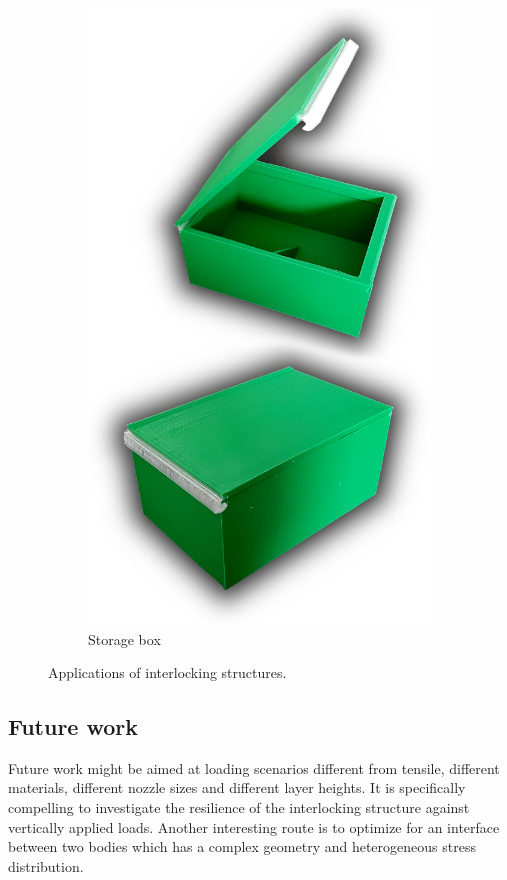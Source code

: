 \begin{figure}
\begin{subfigure}[B]{.3\columnwidth}
		\includegraphics[height=\figheight]{sources/applications/storage_box.jpg}
		\caption{Storage box}
	\end{subfigure}
	\caption{Applications of interlocking structures.}
	\label{fig:applications}
\end{figure}




\subsection{Future work}
Future work might be aimed at loading scenarios different from tensile, different materials, different nozzle sizes and different layer heights.
It is specifically compelling to investigate the resilience of the interlocking structure against vertically applied loads.
Another interesting route is to optimize for an interface between two bodies which has a complex geometry and heterogeneous stress distribution.

